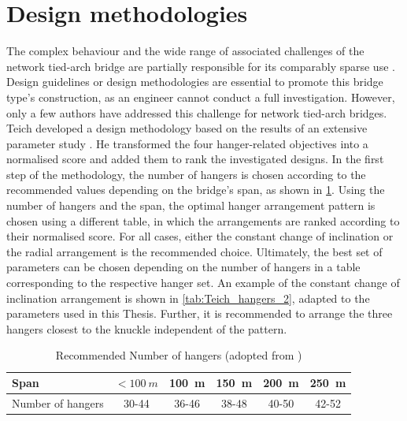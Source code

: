 \section{Design methodologies} \label{sec:rev_meth}
The complex behaviour and the wide range of associated challenges of the network tied-arch bridge are partially responsible for its comparably sparse use \cite{Tveit_How}. Design guidelines or design methodologies are essential to promote this bridge type's construction, as an engineer cannot conduct a full investigation. However, only a few authors have addressed this challenge for network tied-arch bridges.
Teich developed a design methodology based on the results of an extensive parameter study \cite{Teich}. He transformed the four hanger-related objectives into a normalised score and added them to rank the investigated designs. In the first step of the methodology, the number of hangers is chosen according to the recommended values depending on the bridge's span, as shown in \cref{tab:Teich_hangers}. Using the number of hangers and the span, the optimal hanger arrangement pattern is chosen using a different table, in which the arrangements are ranked according to their normalised score. For all cases, either the constant change of inclination or the radial arrangement is the recommended choice. Ultimately, the best set of parameters can be chosen depending on the number of hangers in a table corresponding to the respective hanger set. An example of the constant change of inclination arrangement is shown in \cref{tab:Teich_hangers_2}, adapted to the parameters used in this Thesis. Further, it is recommended to arrange the three hangers closest to the knuckle independent of the pattern.

\begin{table}[H]
\centering
\caption{Recommended Number of hangers (adopted from \cite{Teich})}
\label{tab:Teich_hangers}
\begin{tabular}{lccccc}
\toprule
Span & $< \SI{100}{m}$ & \SI{100}{m} & \SI{150}{m} & \SI{200}{m} & \SI{250}{m} \\ \midrule
Number of hangers & 30-44 & 36-46 & 38-48 & 40-50 & 42-52 \\ \bottomrule
\end{tabular}
\end{table}


